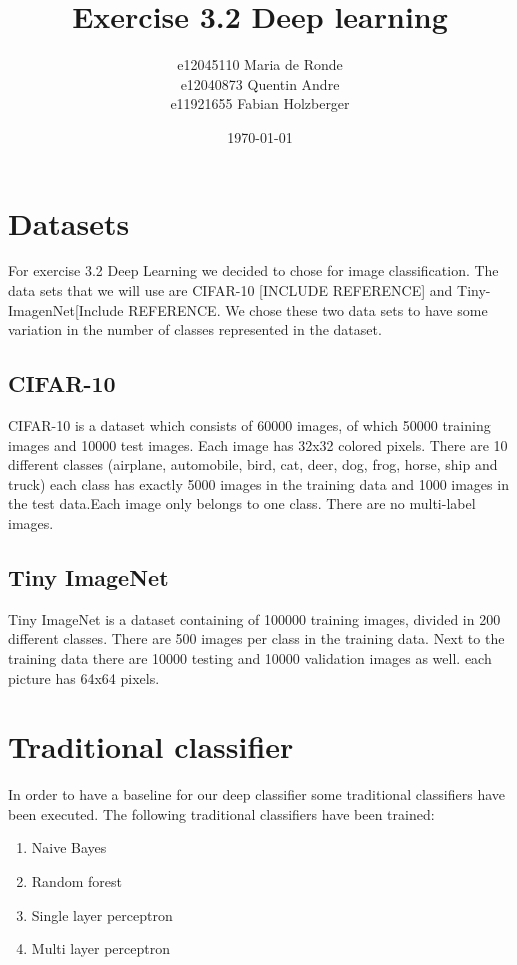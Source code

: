 \documentclass[11pt]{article}
\title{Exercise 3.2 Deep learning}
\author{e12045110 Maria de Ronde \\ e12040873  Quentin Andre  \\ e11921655 Fabian Holzberger}
\date{\today}
\begin{document}
\graphicspath{{./figures/}}
\maketitle

%
\section{Datasets}
For exercise 3.2 Deep Learning we decided to chose for image classification. The data sets that we will use are CIFAR-10 [INCLUDE REFERENCE] and Tiny-ImagenNet[Include REFERENCE. We chose these two data sets to have some variation in the number of classes represented in the dataset.

\subsection{CIFAR-10} 
CIFAR-10 is a dataset which consists of 60000 images, of which 50000 training images and 10000 test images. Each image has 32x32 colored pixels.
There are 10 different classes (airplane, automobile, bird, cat, deer, dog, frog, horse, ship and truck) each class has exactly 5000 images in the training data and 1000 images in the test data.Each image only belongs to one class. There are no multi-label images. 

\subsection{Tiny ImageNet}
Tiny ImageNet is a dataset containing of 100000 training images, divided in 200 different classes. There are 500 images per class in the training data. Next to the training data there are 10000 testing and 10000 validation images as well. each picture has 64x64 pixels.     

\section{Traditional classifier}

In order to have a baseline for our deep classifier some traditional classifiers have been executed. The following traditional classifiers have been trained:
\begin{enumerate}
\item{Naive Bayes}
\item{Random forest}
\item{Single layer perceptron}
\item{Multi layer perceptron}
\end{enumerate}
\end{document}
